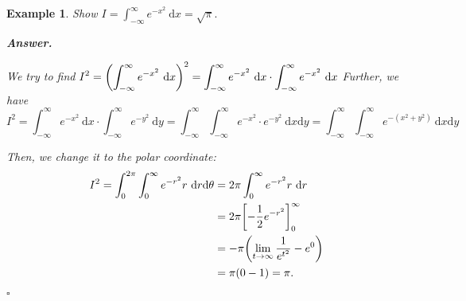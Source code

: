\documentclass[12pt,a4paper]{article}
\newtheorem{eg}{Example}[subsection]
\newenvironment*{ans}{\par\indent\textbf{\textit{Answer. }}\par}{\par\hfill{$\square$}\par}
\def\dsst{\displaystyle}
\def\d{{\mathrm{d}}}
\def\dx{\d x}
\begin{document}
\begin{eg}
	Show $\dsst I=\int_{-\infty}^{\infty}e^{-x^2}\ \dx=\sqrt{\pi}.$
	\begin{ans}
		We try to find $\dsst I^2=\qty(\int_{-\infty}^\infty e^{-x^2}\ \dx)^2=\int_{-\infty}^\infty e^{-x^2}\ \dx\cdot\int_{-\infty}^\infty e^{-x^2}\ \dx$
		Further, we have \[I^2=\int_{-\infty}^\infty e^{-x^2}\ \dx\cdot\int_{-\infty}^\infty e^{-y^2}\ \d y=\int_{-\infty}^\infty \int_{-\infty}^\infty e^{-x^2}\cdot e^{-y^2}\ \dx\d y=\int_{-\infty}^\infty \int_{-\infty}^\infty e^{-(x^2+y^2)}\ \dx\d y\]\par 
		Then, we change it to the polar coordinate: \[\begin{aligned}I^2=\int_0^{2\pi}\int_0^\infty e^{-r^2}r\ \d r\d\theta&=2\pi\int_0^\infty e^{-r^2}r\ \d r\\&=2\pi\qty[-\dfrac{1}{2}e^{-r^2}]_0^\infty\\&=-\pi\qty(\lim_{t\to\infty}\dfrac{1}{e^{t^2}}-e^0)\\&=\pi(0-1)=\pi.\end{aligned}\]
	\end{ans}
\end{eg}
\end{document}
